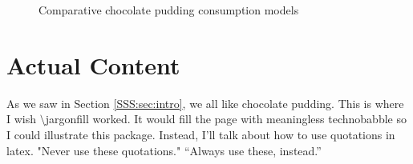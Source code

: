 \documentclass{csri10}
\begin{document}
\begin{figure}[htb]
\begin{center}
  \caption{Comparative chocolate pudding consumption
models}
\end{center}\end{figure}

\section{Actual Content}

As we saw in Section \ref{SSS:sec:intro}, we all like chocolate pudding. This is where I wish
\textsf{$\setminus$jargonfill} worked. It would fill the page with meaningless technobabble so I could illustrate this
package. Instead, I'll talk about how to use quotations in latex. "Never use these quotations." ``Always use these,
instead.''
\end{document}

